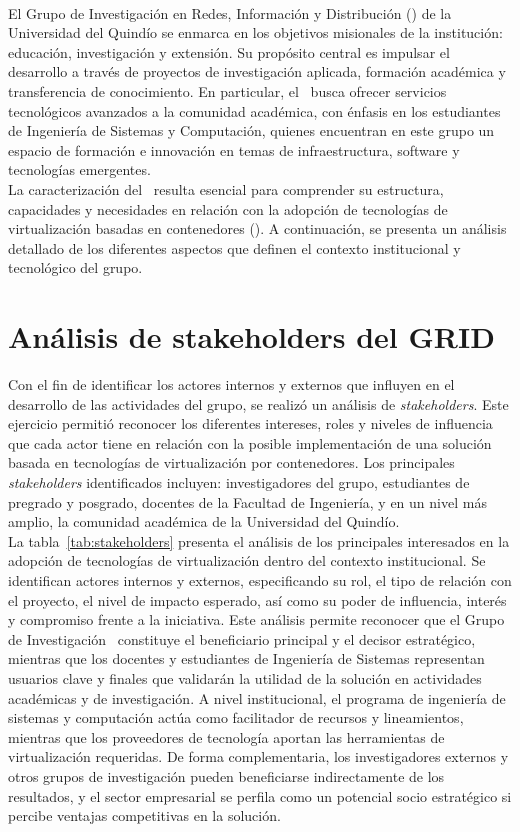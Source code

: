 \label{cap:caracterizacionGRID}
\mbox{}\\
El Grupo de Investigación en Redes, Información y Distribución (\GRID) de la Universidad del Quindío se enmarca en los objetivos misionales de la institución: educación, investigación y extensión. Su propósito central es impulsar el desarrollo a través de proyectos de investigación aplicada, formación académica y transferencia de conocimiento. En particular, el \GRID\ busca ofrecer servicios tecnológicos avanzados a la comunidad académica, con énfasis en los estudiantes de Ingeniería de Sistemas y Computación, quienes encuentran en este grupo un espacio de formación e innovación en temas de infraestructura, software y tecnologías emergentes.\\
La caracterización del \GRID\ resulta esencial para comprender su estructura, capacidades y necesidades en relación con la adopción de tecnologías de virtualización basadas en contenedores (\VBC). A continuación, se presenta un análisis detallado de los diferentes aspectos que definen el contexto institucional y tecnológico del grupo.

\section{Análisis de stakeholders del GRID}
Con el fin de identificar los actores internos y externos que influyen en el desarrollo de las actividades del grupo, se realizó un análisis de \textit{stakeholders}. Este ejercicio permitió reconocer los diferentes intereses, roles y niveles de influencia que cada actor tiene en relación con la posible implementación de una solución basada en tecnologías de virtualización por contenedores. Los principales \textit{stakeholders} identificados incluyen: investigadores del grupo, estudiantes de pregrado y posgrado, docentes de la Facultad de Ingeniería, y en un nivel más amplio, la comunidad académica de la Universidad del Quindío.\\
La tabla~\ref{tab:stakeholders} presenta el análisis de los principales interesados en la adopción de tecnologías de virtualización dentro del contexto institucional. Se identifican actores internos y externos, especificando su rol, el tipo de relación con el proyecto, el nivel de impacto esperado, así como su poder de influencia, interés y compromiso frente a la iniciativa. Este análisis permite reconocer que el Grupo de Investigación \GRID\ constituye el beneficiario principal y el decisor estratégico, mientras que los docentes y estudiantes de Ingeniería de Sistemas representan usuarios clave y finales que validarán la utilidad de la solución en actividades académicas y de investigación. A nivel institucional, el programa de ingeniería de sistemas y computación actúa como facilitador de recursos y lineamientos, mientras que los proveedores de tecnología aportan las herramientas de virtualización requeridas. De forma complementaria, los investigadores externos y otros grupos de investigación pueden beneficiarse indirectamente de los resultados, y el sector empresarial se perfila como un potencial socio estratégico si percibe ventajas competitivas en la solución.


